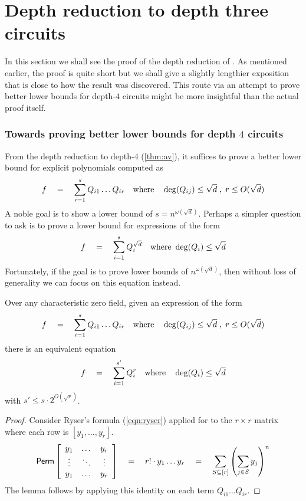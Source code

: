\section{Depth reduction to depth three circuits}\label{sec:depth-3-red}

In this section we shall see the proof of the depth reduction of
\cite{gkks13b}.
As mentioned earlier, the proof is quite short but we shall give a
slightly lengthier exposition that is close to how the result was
discovered.
This route via an attempt to prove better lower bounds for depth-$4$
circuits might be more insightful than the actual proof itself. 

\subsubsection{Towards proving better lower bounds for depth $4$ circuits}

From the depth reduction to depth-$4$ (\autoref{thm:av}), it suffices to
prove a better lower bound for explicit polynomials computed as
\begin{equation}\label{eqn:d4-LB}
f\quad = \quad \sum_{i=1}^s Q_{i1}\dots Q_{ir} \quad\text{where}\quad \deg(Q_{ij})\leq \sqrt{d}\;,\; r\leq O(\sqrt{d})
\end{equation}
A noble goal is to show a lower bound of $s = n^{\omega(\sqrt{d})}$.
Perhaps a simpler question to ask is to prove a lower bound for
expressions of the form
\begin{equation}\label{eqn:d4pow-LB}
f\quad = \quad \sum_{i=1}^s Q_{i}^{\sqrt{d}} \quad\text{where }\deg(Q_i)\leq \sqrt{d}
\end{equation}
Fortunately, if the goal is to prove lower bounds of
$n^{\omega(\sqrt{d})}$, then without loss of generality we can focus
on this equation instead.

\begin{lemma}\label{lem:fischer}
  Over any characteristic zero field, given an expression of the form
  \[
  f\quad = \quad \sum_{i=1}^s Q_{i1}\dots Q_{ir} \quad\text{where}\quad \deg(Q_{ij})\leq \sqrt{d}\;,\; r\leq O(\sqrt{d})
  \]
  there is an equivalent equation
  \[
  f\quad = \quad \sum_{i=1}^{s'} Q_{i}^r\quad\text{where}\quad \deg(Q_{i})\leq \sqrt{d}
  \]
  with $s' \leq s \cdot 2^{O(\sqrt{r})}$. 
\end{lemma}
\begin{proof}
  Consider Ryser's formula (\ref{eqn:ryser}) applied for to the
  $r\times r$ matrix where each row is $[y_1,\dots, y_r]$. 
  \[
  \operatorname{\mathsf{Perm}} \left[\begin{array}{ccc} y_1 & \dots & y_r\\ \vdots & \ddots & \vdots \\ y_1 & \dots & y_r\end{array}\right] \quad = \quad r! \cdot y_1\dots y_r \quad = \quad \sum_{S\subseteq [r]} \left(\sum_{j\in S} y_j\right)^n
  \]
  The lemma follows by applying this identity on each term
  $Q_{i1}\dots Q_{ir}$. 
\end{proof}

